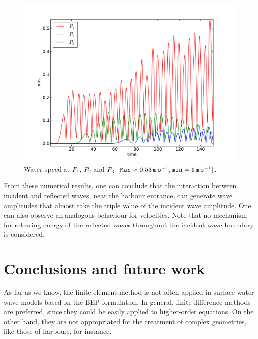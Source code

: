 \begin{figure}[!htb]
{\centering
\includegraphics[width=\largefig]{chapters/lopes/pdf/velprofile.pdf}
\caption{Water speed  at $P_1$, $P_2$ and $P_3$
$[{\tt Max}\approx 0.53\, {\tt m\, s}^{-1}, {\tt min}=0\,{\tt m\, s}^{-1}]$.}\label{lopes:fig:velp}\par}
\end{figure}

From these numerical results, one can conclude that the
interaction between incident and reflected waves, near the harbour entrance,
 can generate wave amplitudes that  almost  take the
 triple value  of the incident wave amplitude.
One can also observe an analogous behaviour for
velocities.
Note that no
mechanism for releasing energy of the reflected waves
throughout the incident wave boundary is considered.


\section{Conclusions and future work}

As far as we know,  the finite element
method is not often applied in surface water wave models
based on the BEP formulation.
In general, finite difference methods are preferred, since
they could be easily applied to higher-order equations.
On the  other hand, they are not appropriated for the
treatment of complex geometries, like those of harbours,
for instance.

